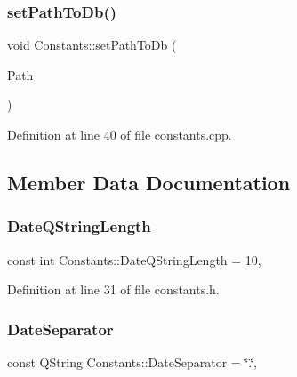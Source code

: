 \subsubsection{\texorpdfstring{set\+Path\+To\+Db()}{setPathToDb()}\hspace{0.1cm}{\footnotesize\ttfamily [2/2]}}
{\footnotesize\ttfamily void Constants\+::set\+Path\+To\+Db (\begin{DoxyParamCaption}\item[{const Q\+String \&}]{Path }\end{DoxyParamCaption})\hspace{0.3cm}{\ttfamily [static]}}



Definition at line 40 of file constants.\+cpp.



\subsection{Member Data Documentation}
\hypertarget{classConstants_ae5b9b8df2388680fdacc61f9c247307d}{}\label{classConstants_ae5b9b8df2388680fdacc61f9c247307d} 
\subsubsection{\texorpdfstring{Date\+Q\+String\+Length}{DateQStringLength}}
{\footnotesize\ttfamily const int Constants\+::\+Date\+Q\+String\+Length = 10\hspace{0.3cm}{\ttfamily [static]}, {\ttfamily [private]}}



Definition at line 31 of file constants.\+h.

\hypertarget{classConstants_a1b884c97c8f0c86fa5f8e050e38deca4}{}\label{classConstants_a1b884c97c8f0c86fa5f8e050e38deca4} 
\subsubsection{\texorpdfstring{Date\+Separator}{DateSeparator}}
{\footnotesize\ttfamily const Q\+String Constants\+::\+Date\+Separator = \char`\"{}.\char`\"{}\hspace{0.3cm}{\ttfamily [static]}, {\ttfamily [private]}}



